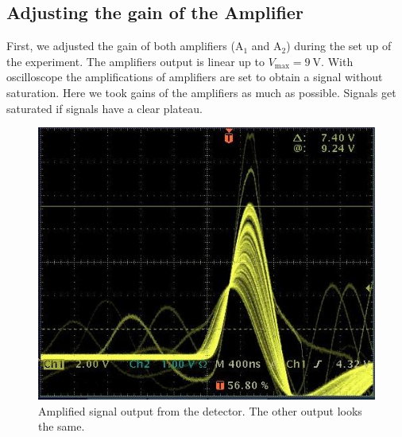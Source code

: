 \subsection{Adjusting the gain of the Amplifier}
First, we adjusted the gain of both amplifiers  ($\text{A}_{1}$ and $\text{A}_{2}$) during the set up of the experiment. The amplifiers output is linear up to $V_\text{max}=\SI{9}{\volt}$. With oscilloscope the amplifications of amplifiers are set to obtain a signal without saturation. Here we took gains of the amplifiers as much as possible. Signals get saturated if signals have a clear plateau. 
\begin{figure}[ht]
	\centering
	\includegraphics[width=0.6\linewidth]{./figs/Amplifier.jpg}
	\caption{Amplified signal output from the detector. The other output looks the same.}%
	\label{fig:Amplified}
\end{figure}


